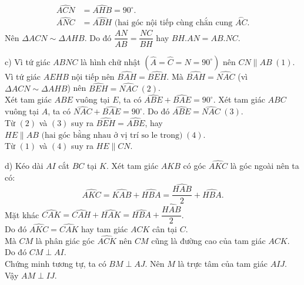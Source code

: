 \begin{ex}
{{\begin{align*}
\widehat{ACN}&=\widehat{AHB}=90^\circ.\\
\widehat{ANC}&=\widehat{ABH} \text{ (hai góc nội tiếp cùng chắn cung $\stackrel\frown{AC}$.}
\end{align*}
Nên $\Delta ACN \sim \Delta AHB$. Do đó $\dfrac{AN}{AB}=\dfrac{NC}{BH}$ hay $BH.AN=AB.NC$.
\par c) Vì tứ giác $ABNC$ là hình chữ nhật $(\widehat{A}=\widehat{C}=\widehat{N}=90^\circ)$ nên $CN \parallel AB \hspace{3pt} (1)$.\\
Vì tứ giác $AEHB$ nội tiếp nên $\widehat{BAH}=\widehat{BEH}$. Mà $\widehat{BAH}=\widehat{NAC}$ (vì $\Delta ACN \sim \Delta AHB$) nên $\widehat{BEH}=\widehat{NAC} \hspace{3pt} (2)$.\\
Xét tam giác $ABE$ vuông tại $E$, ta có $\widehat{ABE}+\widehat{BAE}=90^\circ$.
Xét tam giác $ABC$ vuông tại $A$, ta có $\widehat{NAC}+\widehat{BAE}=90^\circ$.
Do đó $\widehat{ABE}=\widehat{NAC} \hspace{3pt} (3)$.\\
Từ $(2)$ và $(3)$ suy ra $\widehat{BEH}=\widehat{ABE}$, hay $HE \parallel AB \text{ (hai góc bằng nhau ở vị trí so le trong)}\hspace{3pt} (4)$.\\
Từ $(1)$ và $(4)$ suy ra $HE \parallel CN$.
\par d) Kéo dài $AI$ cắt $BC$ tại $K$. Xét tam giác $AKB$ có góc $\widehat{AKC}$ là góc ngoài nên ta có:
$$\widehat{AKC}=\widehat{KAB}+\widehat{HBA}=\dfrac{\widehat{HAB}}{2}+\widehat{HBA}.$$
Mặt khác $\widehat{CAK}=\widehat{CAH}+\widehat{HAK}=\widehat{HBA}+\dfrac{\widehat{HAB}}{2}$.\\
Do đó $\widehat{AKC}=\widehat{CAK}$ hay tam giác $ACK$ cân tại $C$.\\
Mà $CM$ là phân giác góc $\widehat{ACK}$ nên $CM$ cũng là đường cao của tam giác $ACK$. Do đó $CM \perp AI$.\\
Chứng minh tương tự, ta có $BM \perp AJ$. Nên $M$ là trực tâm của tam giác $AIJ$. Vậy $AM \perp IJ$.}}
\end{ex}

